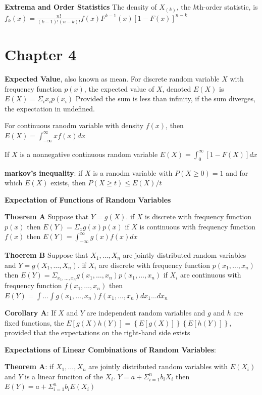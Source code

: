 \documentclass{article}
\begin{document}
\begin{multicols*}{2}
    \textbf{Extrema and Order Statistics}
    The density of $X_{(k)}$, the $k$th-order statistic, is $f_k(x) = \frac{n!}{(k-1)! (n-k)!}f(x) F^{k-1}(x) \left[1-F(x)\right]^{n-k}$

    \section{Chapter 4}

    \textbf{Expected Value}, also known as mean.
    For discrete random variable $X$ with frequency function $p(x)$, the expected value of $X$, denoted $E(X)$ is $E(X) = \Sigma_i x_i p(x_i)$
    Provided the sum is less than infinity, if the sum diverges, the expectation in undefined.

    For continuous ranodm variable with density $f(x)$, then $E(X) = \int_{-\infty}^\infty xf(x) dx$

    If $X$ is a nonnegative continuous random variable $E(X) = \int^\infty_0 \left[1-F(X)\right] dx$

    \textbf{markov's inequality}: if $X$ is a ranodm variable with $P(X \geq 0) = 1$ and for which $E(X)$ exists, then $P(X \geq t) \leq E(X) / t$

    \textbf{Expectation of Functions of Random Variables}

    \textbf{Thoerem A}
    Suppose that $Y=g(X)$.
    if $X$ is discrete with frequency function $p(x)$ then $E(Y) = \Sigma_xg(x)p(x)$
    if $X$ is continuous with frequency function $f(x)$ then $E(Y) = \int_{-\infty}^\infty g(x)f(x) dx$

    \textbf{Thoerem B}
    Suppose that $X_1, \dots, X_n$ are jointly distributed random variables and $Y=g(X_1, \dots, X_n)$.
    if $X_i$ are discrete with frequency function $p(x_1, \dots, x_n)$ then $E(Y) = \Sigma_{x_1,\dots, x_n} g(x_1, \dots, x_n) p(x_1, \dots, x_n)$
    if $X_i$ are continuous with frequency function $f(x_1, \dots, x_n)$ then $E(Y) = \int \dots \int g(x_1, \dots, x_n) f(x_1, \dots, x_n) dx_1\dots dx_n$

    \textbf{Corollary A}:
    If $X$ and $Y$ are independent random variables and $g$ and $h$ are fixed functions,
    the $E\left[g(X) h(Y)\right] = \left\{E[g(X)]\right\} \left\{ E[h(Y)] \right\}$,
    provided that the expectations on the right-hand side exists

    \textbf{Expectations of Linear Combinations of Random Variables}:

    \textbf{Theorem A}:
    if $X_1, \dots, X_n$ are jointly distributed random variables with $E(X_i)$ and $Y$ is a linear funciton of the $X_i$.
    $Y = a + \Sigma_{i=1}^nb_iX_i$ then $E(Y) = a + \Sigma_{i=1}^nb_i E(X_i)$


\end{multicols*}
\end{document}

